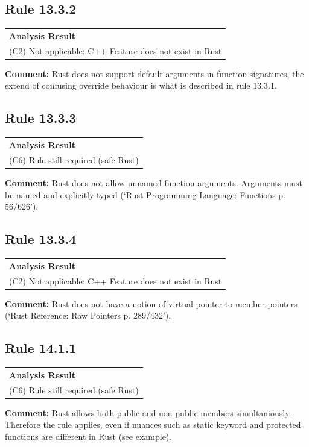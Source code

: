 \subsection*{Rule 13.3.2}
\begin{longtable}{p{13cm}}
\textbf{Analysis Result} \\
(C2) Not applicable: C++ Feature does not exist in Rust \\
\end{longtable}
\textbf{Comment:} Rust does not support default arguments in function signatures, the extend of confusing override behaviour is what is described in rule 13.3.1. \\
\subsection*{Rule 13.3.3}
\begin{longtable}{p{13cm}}
\textbf{Analysis Result} \\
(C6) Rule still required (safe Rust) \\
\end{longtable}
\textbf{Comment:} Rust does not allow unnamed function arguments. Arguments must be named and explicitly typed (`Rust Programming Language: Functions p. 56/626'). \\


\subsection*{Rule 13.3.4}
\begin{longtable}{p{13cm}}
\textbf{Analysis Result} \\
(C2) Not applicable: C++ Feature does not exist in Rust \\
\end{longtable}
\textbf{Comment:}  Rust does not have a notion of virtual pointer-to-member pointers (`Rust Reference: Raw Pointers p. 289/432'). \\
\subsection*{Rule 14.1.1}
\begin{longtable}{p{13cm}}
\textbf{Analysis Result} \\
(C6) Rule still required (safe Rust) \\
\end{longtable}
\textbf{Comment:} Rust allows both public and non-public members simultaniously. Therefore the rule applies, even if nuances such as static keyword and protected functions are different in Rust (see example). \\


